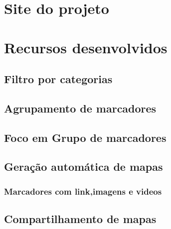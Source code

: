 \section{Site do projeto}
\section{Recursos desenvolvidos}
\subsection{Filtro por categorias}
\subsection{Agrupamento de marcadores}	
\subsection{Foco em Grupo de marcadores}

\subsection{Geração automática de mapas}
\subsubsection{Marcadores com link,imagens e videos}
\subsection{Compartilhamento de mapas}

